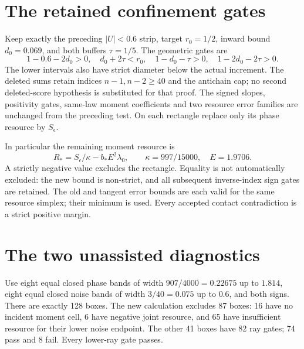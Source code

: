 \documentclass[11pt]{article}
\begin{document}
\section{The retained confinement gates}
Keep exactly the preceding $|U|<0.6$ strip, target $r_0=1/2$, inward
bound $d_0=0.069$, and both buffers $\tau=1/5$. The geometric gates are
\[
 1-0.6-2d_0>0,\quad d_0+2\tau<r_0,\quad
 1-d_0-\tau>0,\quad1-2d_0-2\tau>0.
\]
The lower intervals also have strict diameter below the actual increment.
The deleted sums retain indices $n-1,n-2\ge40$ and the antichain cap;
no second deleted-score hypothesis is substituted for that proof.
The signed slopes, positivity gates, same-law moment coefficients and
two resource error families are unchanged from the preceding test.
On each rectangle replace only its phase resource by $S_\epsilon$.

In particular the remaining moment resource is
\[
 R_*=S_\epsilon/\kappa-b_*E^2\lambda_0,\qquad
 \kappa=997/15000,\quad E=1.9706.
\]
A strictly negative value excludes the rectangle. Equality is not
automatically excluded: the new bound is non-strict, and all subsequent
inverse-index sign gates are retained. The old and tangent error bounds
are each valid for the same resource simplex; their minimum is used.
Every accepted contact contradiction is a strict positive margin.

\section{The two unassisted diagnostics}
Use eight equal closed phase bands of width $907/4000=0.22675$ up to
$1.814$, eight equal closed noise bands of width $3/40=0.075$ up to
$0.6$, and both signs. There are exactly 128 boxes.
The new calculation excludes 87 boxes: 16 have no incident moment cell,
6 have negative joint resource, and 65 have insufficient resource for
their lower noise endpoint. The other 41 boxes have 82 ray gates;
74 pass and 8 fail. Every lower-ray gate passes.
\end{document}
